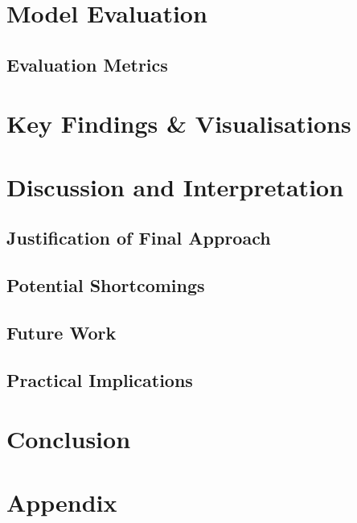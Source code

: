 \documentclass[12pt,a4paper,titlepage]{article}
\begin{document}
\section*{Model Evaluation}
\subsection*{Evaluation Metrics}

\section*{Key Findings \& Visualisations}


\section*{Discussion and Interpretation}

\subsection*{Justification of Final Approach}

\subsection*{Potential Shortcomings}

\subsection*{Future Work}

\subsection*{Practical Implications}

\section*{Conclusion}

\appendix
\section{Appendix}
\end{document}
